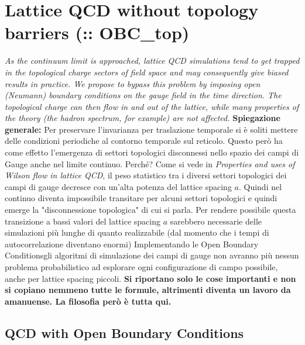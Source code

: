\documentclass[12pt,a4paper,openright]{article}
\newcommand{\colg}{\textcolor{PineGreen}}
\newcommand{\colr}{\textcolor{BrickRed}}
\newcommand{\obc}{Open Boundary Conditions}
\begin{document}
\newpage

\newpage

\section{Lattice QCD without topology barriers (:: OBC\_top)}

{\it As the continuum limit is approached, lattice QCD simulations tend to get trapped in the
topological charge sectors of field space and may consequently give biased results in practice.
We propose to bypass this problem by imposing \colg{open (Neumann) boundary conditions on
the gauge field in the time direction}. The topological charge can then flow in and out of
the lattice, while many properties of the theory (the hadron spectrum, for example) are
not affected.}
\newline\newline
{\bf Spiegazione generale:}\newline
\colg{Per preservare l'invarianza per traslazione temporale si è soliti mettere delle condizioni periodiche al contorno temporale sul reticolo.
Questo però ha come effetto l'emergenza di settori topologici disconnessi nello spazio dei campi di Gauge anche nel limite continuo.
Perché? Come si vede in {\it Properties and uses of Wilson flow in lattice QCD}, il peso statistico tra i diversi settori topologici dei campi di gauge decresce con un'alta potenza del lattice spacing $a$.
Quindi nel continuo diventa impossibile transitare per alcuni settori topologici e quindi emerge la "disconnessione topologica" di cui si parla.
Per rendere possibile questa transizione a bassi valori del lattice spacing $a$ sarebbero necessarie delle simulazioni più lunghe di quanto realizzabile (dal momento che i tempi di autocorrelazione diventano enormi)
\newline
Implementando le \obc gli algoritmi di simulazione dei campi di gauge non avranno più nessun problema probabilistico ad esplorare ogni configurazione di campo possibile, anche per lattice spacing piccoli}.
\newline\newline
\colr{\bf Si riportano solo le cose importanti e non si copiano nemmeno tutte le formule, altrimenti diventa un lavoro da amanuense. La filosofia però è tutta qui.}

\subsection{QCD with \obc}
\end{document}
